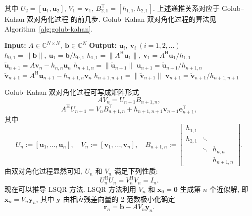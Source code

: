 {其中 $U_2=[\bm u_1,\bm u_2]$, $V_1=\bm v_1$, $B_{2,1}^{\top}=[h_{1,1},h_{2,1}]$. 上述递推关系对应于 Golub--Kahan 双对角化过程  的前几步. Golub--Kahan 双对角化过程的算法见 Algorithm\ \ref{alg:golub-kahan}.}
\begin{algorithm}[H]\caption{{Golub--Kahan 双对角化过程}}\label{alg:golub-kahan}\begin{algorithmic}[1]
\Statex\textbf{Input:} $A\in\mathbb C^{N\times N},\ \bm b\in\mathbb C^N$
\Statex\textbf{Output:} $\bm u_i,\ \bm v_i\ (i=1,2,\ldots)$
\State $h_{0,1}=\|\bm b\|,\ \bm u_1=\bm b/h_{0,1}$
\State $h_{1,1}=\|A^{\mathrm H}\bm u_1\|,\ \bm v_1=A^{\mathrm H}\bm u_1/h_{1,1}$
\State $\widetilde{\bm u}_{n+1}=A\bm v_n-h_{n,n}\bm u_n$
\State $h_{n+1,n}=\|\widetilde{\bm u}_{n+1}\|$
\State $\bm u_{n+1}=\widetilde{\bm u}_{n+1}/h_{n+1,n}$
\State $\widetilde{\bm v}_{n+1}=A^{\mathrm H}\bm u_{n+1}-h_{n+1,n}\bm v_n$
\State $h_{n+1,n+1}=\|\widetilde{\bm v}_{n+1}\|$
\State $\bm v_{n+1}=\widetilde{\bm v}_{n+1}/h_{n+1,n+1}$
\EndFor\end{algorithmic}\end{algorithm}
{Golub--Kahan 双对角化过程可写成矩阵形式}
\begin{equation}\label{eq:golub-kahan-matrix-forward}AV_n=U_{n+1}B_{n+1,n},\end{equation}
\[A^{\mathrm H}U_{n+1}=V_nB_{n+1,n}^{\top}+h_{n+1,n+1}\bm v_{n+1}\bm e_{n+1}^{\top},\]
{其中}
\[U_n:=[\bm u_1,\ldots,\bm u_n],\quad V_n:=[\bm v_1,\ldots,\bm v_n],\quad B_{n+1,n}:=\begin{bmatrix}h_{1,1}&&\\h_{2,1}&\ddots&\\&\ddots&h_{n,n}\\&&h_{n+1,n}\end{bmatrix}.\]
{由双对角化过程显然可知, $U_n$ 和 $V_n$ 满足下列性质:}
\begin{equation}\label{eq:golub-kahan-orthonormality}U_n^{\mathrm H}U_n=V_n^{\mathrm H}V_n=I_n.\end{equation}
{现在可以推导 LSQR 方法. LSQR 方法利用 $V_n$ 和 $\bm x_0=\bm0$ 生成第 $n$ 个近似解, 即 $\bm x_n=V_n\bm y_n$, 其中 $\bm y$ 由相应残差向量的 2-范数极小化确定}
\begin{equation}\label{eq:lsqr-residual}\bm r_n=\bm b-AV_n\bm y_n.\end{equation}
